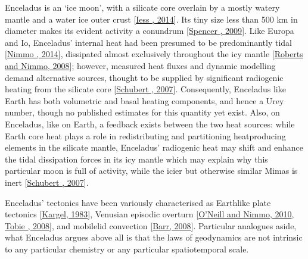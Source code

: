 \documentclass[letterpaper,10pt,english]{jupyterBook}
\begin{document}
\sphinxAtStartPar
Enceladus is an ‘ice moon’, with a silicate core overlain by a mostly watery mantle and a water ice outer crust {[}\hyperlink{cite.references:id492}{Iess , 2014}{]}. Its tiny size \sphinxhyphen{} less than 500 km in diameter \sphinxhyphen{} makes its evident activity a conundrum {[}\hyperlink{cite.references:id484}{Spencer , 2009}{]}. Like Europa and Io, Enceladus’ internal heat had been presumed to be predominantly tidal {[}\hyperlink{cite.references:id482}{Nimmo , 2014}{]}, dissipated almost exclusively throughout the icy mantle {[}\hyperlink{cite.references:id478}{Roberts and Nimmo, 2008}{]}; however, measured heat fluxes and dynamic modelling demand alternative sources, thought to be supplied by significant radiogenic heating from the silicate core {[}\hyperlink{cite.references:id485}{Schubert , 2007}{]}. Consequently, Enceladus \sphinxhyphen{} like Earth \sphinxhyphen{} has both volumetric and basal heating components, and hence a Urey number, though no published estimates for this quantity yet exist. Also, on Enceladus, like on Earth, a feedback exists between the two heat sources: while Earth core heat plays a role in redistributing and partitioning heat\sphinxhyphen{}producing elements in the silicate mantle, Enceladus’ radiogenic heat may shift and enhance the tidal dissipation forces in its icy mantle \sphinxhyphen{} which may explain why this particular moon is full of activity, while the icier but otherwise similar Mimas is inert {[}\hyperlink{cite.references:id485}{Schubert , 2007}{]}.

\sphinxAtStartPar
Enceladus’ tectonics have been variously characterised as Earth\sphinxhyphen{}like plate tectonics {[}\hyperlink{cite.references:id432}{Kargel, 1983}{]}, Venusian episodic overturn {[}\hyperlink{cite.references:id495}{O'Neill and Nimmo, 2010}, \hyperlink{cite.references:id491}{Tobie , 2008}{]}, and mobile\sphinxhyphen{}lid convection {[}\hyperlink{cite.references:id486}{Barr, 2008}{]}. Particular analogues aside, what Enceladus argues above all is that the laws of geodynamics are not intrinsic to any particular chemistry or any particular spatiotemporal scale.
\end{document}

